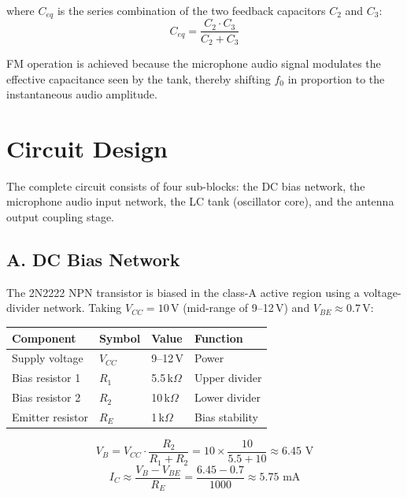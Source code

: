 \documentclass[10pt, twocolumn]{article}
\begin{document}
where $C_{eq}$ is the series combination of the two feedback capacitors
$C_2$ and $C_3$:
\begin{equation}
  C_{eq} = \frac{C_2 \cdot C_3}{C_2 + C_3}
  \label{eq:ceq}
\end{equation}

FM operation is achieved because the microphone audio signal modulates the
effective capacitance seen by the tank, thereby shifting $f_0$ in proportion
to the instantaneous audio amplitude.

\section{Circuit Design}

The complete circuit consists of four sub-blocks: the DC bias network,
the microphone audio input network, the LC tank (oscillator core), and
the antenna output coupling stage.

\subsection{A. DC Bias Network}

The 2N2222 NPN transistor is biased in the class-A active region using a
voltage-divider network. Taking $V_{CC} = 10$\,V (mid-range of 9--12\,V)
and $V_{BE} \approx 0.7$\,V:

\begin{center}
\begin{tabular}{llll}
  \toprule
  Component & Symbol & Value & Function \\
  \midrule
  Supply voltage   & $V_{CC}$ & 9--12\,V       & Power \\
  Bias resistor 1  & $R_1$    & 5.5\,k$\Omega$ & Upper divider \\
  Bias resistor 2  & $R_2$    & 10\,k$\Omega$  & Lower divider \\
  Emitter resistor & $R_E$    & 1\,k$\Omega$   & Bias stability \\
  \bottomrule
\end{tabular}
\end{center}

\begin{equation}
  V_B = V_{CC}\cdot\frac{R_2}{R_1+R_2}
      = 10\times\frac{10}{5.5+10} \approx 6.45\text{ V}
\end{equation}
\begin{equation}
  I_C \approx \frac{V_B - V_{BE}}{R_E}
           = \frac{6.45-0.7}{1000} \approx 5.75\text{ mA}
\end{equation}
\end{document}
